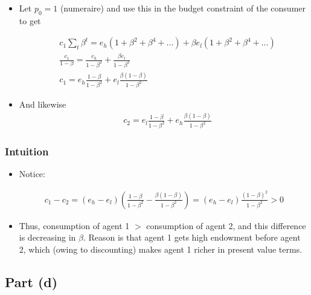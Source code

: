 \documentclass{scrartcl}
\newcommand{\bit}{\begin{itemize}}
\newcommand{\eit}{\end{itemize}}
\begin{document}
\begin{itemize}
	\item Let $p_0=1$ (numeraire) and use this in the budget constraint of the consumer to get
	
	\begin{align}
	&c_1 \sum_t \beta^t= e_h (1+\beta^2+\beta^4+...)+ \beta e_l (1+\beta^2+\beta^4+...) \nonumber \\
	&\frac{c_1}{1-\beta}=\frac{e_h}{1-\beta^2}+\frac{\beta e_l}{1-\beta^2} \nonumber \\
	&c_{1}=e_h\frac{1-\beta}{1-\beta^2}+e_l\frac{\beta(1-\beta)}{1-\beta^2}
	\end{align}
	
	\item And likewise
	\begin{align}
	&c_{2}=e_l\frac{1-\beta}{1-\beta^2}+e_h\frac{\beta(1-\beta)}{1-\beta^2}
	\end{align}
	
	\end{itemize}

\subsubsection*{Intuition}

\bit

\item Notice:

\begin{align}
c_1-c_2=\left(e_h-e_l \right) \left( \frac{1-\beta}{1-\beta^2}-\frac{\beta(1-\beta)}{1-\beta^2} \right)=\left(e_h-e_l \right)\frac{(1-\beta)^2}{1-\beta^2}>0
\end{align}

\item Thus, consumption of agent 1 $>$ consumption of agent 2, and this difference is decreasing in $\beta$. Reason is that agent 1 gets high endowment before agent 2, which (owing to discounting) makes agent 1 richer in present value terms. 

\eit


\subsection*{Part (d)}
\end{document}

